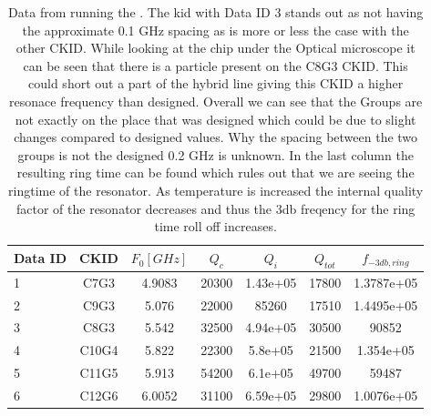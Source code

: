 \begin{table}[ht]
    \centering
    \begin{tabular}[t]{lcccccc}
    \toprule
    Data ID & CKID & $F_{0} [GHz]$ & $Q_{c}$& $Q_{i}$& $Q_{tot}$ & $f_{-3db,ring}$\\
    \midrule
	1 & C7G3  & 4.9083 & 20300 & 1.43e+05 & 17800 & 1.3787e+05 \\ \hline
	2 & C9G3  & 5.076 & 22000 & 85260 & 17510 & 1.4495e+05 \\ \hline
	3 & C8G3  & 5.542 & 32500 & 4.94e+05 & 30500 & 90852 \\ \hline
	4 & C10G4 & 5.822 & 22300 & 5.8e+05 & 21500 & 1.354e+05 \\ \hline
	5 & C11G5 & 5.913 & 54200 & 6.1e+05 & 49700 & 59487 \\ \hline
	6 & C12G6 & 6.0052 & 31100 & 6.59e+05 & 29800 & 1.0076e+05 \\ \hline
    \bottomrule
    \end{tabular}
    \caption{Data from running the . The kid with Data ID 3 stands out as not having the approximate 0.1 GHz spacing as is more or less the case with the other CKID. While looking at the chip under the Optical microscope it can be seen that there is a particle present on the C8G3 CKID. This could short out a part of the hybrid line giving this CKID a higher resonace frequency than designed. Overall we can see that the Groups are not exactly on the place that was designed which could be due to slight changes compared to designed values. Why the spacing between the two groups is not the designed 0.2 GHz is unknown. In the last column the resulting ring time can be found which rules out that we are seeing the ringtime of the resonator. As temperature is increased the internal quality factor of the resonator decreases and thus the 3db freqency for the ring time roll off increases. }
    \label{tab:}
\end{table}%


